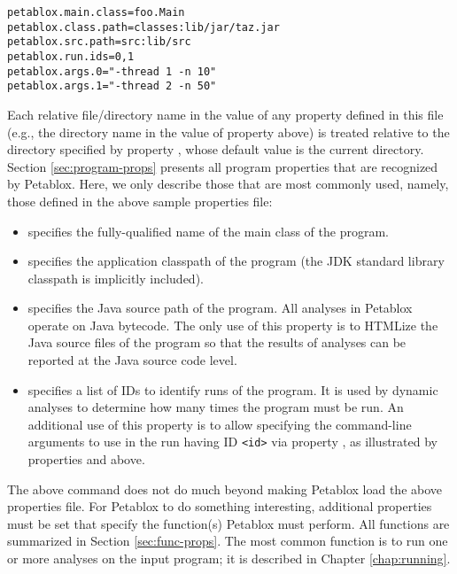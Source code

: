 \begin{framed}
\begin{verbatim}
petablox.main.class=foo.Main
petablox.class.path=classes:lib/jar/taz.jar
petablox.src.path=src:lib/src
petablox.run.ids=0,1
petablox.args.0="-thread 1 -n 10"
petablox.args.1="-thread 2 -n 50"
\end{verbatim}
\end{framed}

Each relative file/directory name in the value of any property
defined in this file (e.g., the  directory name in the value of
property  above) is treated relative to the directory
specified by property , whose default value
is the current directory.
Section \ref{sec:program-props} presents all program properties that are
recognized by Petablox.  Here, we only describe those that are most commonly
used, namely, those defined in the above sample properties file:

\begin{itemize}
\item
{} specifies the fully-qualified name of the main
class of the program.
\item
{} specifies the application classpath
of the program (the JDK standard library classpath is implicitly
included).
\item
{} specifies the Java source path of the program.
All analyses in Petablox operate on Java bytecode.  The only use
of this property is to HTMLize the Java source files of the program so
that the results of analyses can be reported at the Java
source code level.
\item
{} specifies a list of IDs to identify runs of the
program.  It is used by dynamic analyses to determine how many
times the program must be run.  An additional use of this property is
to allow specifying the command-line arguments to use in the run
having ID {\tt <id>} via property , as
illustrated by properties  and 
above.
\end{itemize}

The above command does not do much beyond making Petablox load the above
properties file.  For Petablox to do something interesting,
additional properties must be set that specify the function(s)
Petablox must perform.  All functions are summarized in Section \ref{sec:func-props}.
The most common function is to run one or more analyses on the input program;
it is described in Chapter \ref{chap:running}.

